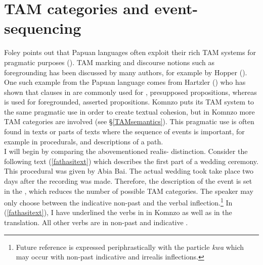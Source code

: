 \section{TAM categories and event-sequencing} \label{info-tam-event}

Foley points out that Papuan languages often exploit their rich TAM systems for pragmatic purposes (\citeyear[389]{Foley:2000uh}). TAM marking and discourse notions such as foregrounding has been discussed by many authors, for example by Hopper (\citeyear{Hopper:1979us}). One such example from the Papuan language  comes from Hartzler (\citeyear{Hartzler:1983wm}) who has shown that clauses in  are commonly used for , presupposed propositions, whereas  is used for foregrounded, asserted propositions. Komnzo puts its TAM system to the same pragmatic use in order to create textual cohesion, but in Komnzo more TAM categories are involved (see \S{}\ref{TAMsemantics}). This pragmatic use is often found in texts or parts of texts where the sequence of events is important, for example in procedurals, and descriptions of a path.\\

I will begin by comparing the abovementioned realis- distinction. Consider the following text (\ref{fathasitext}) which describes the first part of a wedding ceremony. This procedural was given by Abia Bai. The actual wedding took take place two days after the recording was made. Therefore, the description of the event is set in the , which reduces the number of possible TAM categories. The speaker may only choose between the indicative non-past and the  verbal inflection.\footnote{Future reference is expressed periphrastically with the particle \emph{kwa} which may occur with non-past indicative and irrealis inflections.} In (\ref{fathasitext}), I have underlined the verbs in   in Komnzo as well as in the  translation. All other verbs are in non-past and indicative .

